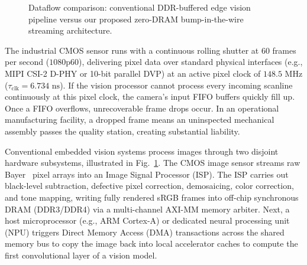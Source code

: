\documentclass[conference]{IEEEtran}
\begin{document}
\begin{figure}[t]
{%
}
\caption{Dataflow comparison: conventional DDR-buffered edge vision pipeline versus our proposed zero-DRAM bump-in-the-wire streaming architecture.}
\label{fig:pipeline_comparison}
\end{figure}

The industrial CMOS sensor runs with a continuous rolling shutter at 60 frames per second ($1080\text{p}60$), delivering pixel data over standard physical interfaces (e.g., MIPI CSI-2 D-PHY or 10-bit parallel DVP) at an active pixel clock of $148.5\text{ MHz}$ ($\tau_{\text{clk}} = 6.734\text{ ns}$). If the vision processor cannot process every incoming scanline continuously at this pixel clock, the camera's input FIFO buffers quickly fill up. Once a FIFO overflows, unrecoverable frame drops occur. In an operational manufacturing facility, a dropped frame means an uninspected mechanical assembly passes the quality station, creating substantial liability.

Conventional embedded vision systems process images through two disjoint hardware subsystems, illustrated in Fig.~\ref{fig:pipeline_comparison}. The CMOS image sensor streams raw Bayer~\cite{bayer1976color} pixel arrays into an Image Signal Processor (ISP). The ISP carries out black-level subtraction, defective pixel correction, demosaicing, color correction, and tone mapping, writing fully rendered sRGB frames into off-chip synchronous DRAM (DDR3/DDR4) via a multi-channel AXI-MM memory arbiter. Next, a host microprocessor (e.g., ARM Cortex-A) or dedicated neural processing unit (NPU) triggers Direct Memory Access (DMA) transactions across the shared memory bus to copy the image back into local accelerator caches to compute the first convolutional layer of a vision model.
\end{document}
